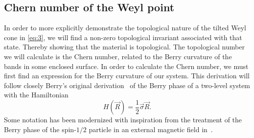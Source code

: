 \subsection{Chern number of the Weyl point}\label{sec:chern-number-weyl}
In order to more explicitly demonstrate the topological nature of the tilted Weyl cone in \cref{eq:3}, we will find a non-zero topological invariant associated with that state.
Thereby showing that the material is topological.
The topological number we will calculate is the Chern number, related to the Berry curvature of the bands in some enclosed surface.
In order to calculate the Chern number, we must first find an expression for the Berry curvature of our system.
This derivation will follow closely Berry's original derivation~\cite{berryQuantalPhaseFactors1984} of the Berry phase of a two-level system with the Hamiltonian
\begin{equation}
  \label{eq:6}
  H(\vec{R}) = \frac12 \vec\sigma \vec{R}.
\end{equation}
Some notation has been modernized with inspiration from the treatment of the Berry phase of the spin-$1 /2$ particle in an external magnetic field in~\textcite{holsteinAdiabaticTheoremBerry1989}.

